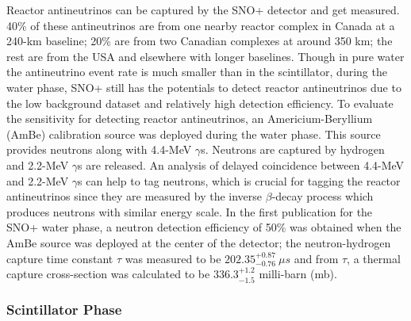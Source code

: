 Reactor antineutrinos can be captured by the SNO+ detector and get measured. 40\% of these antineutrinos are from one nearby reactor complex in Canada at a 240-km baseline; 20\% are from two Canadian complexes at around 350 km; the rest are from the USA and elsewhere with longer baselines\cite{whitepaper}. Though in pure water the antineutrino event rate is much smaller than in the scintillator, during the water phase, SNO+ still has the potentials to detect reactor antineutrinos due to the low background dataset and relatively high detection efficiency. To evaluate the sensitivity for detecting reactor antineutrinos, an Americium-Beryllium (AmBe) calibration source was deployed during the water phase. This source provides neutrons along with 4.4-MeV $\gamma$s. Neutrons are captured by hydrogen and 2.2-MeV $\gamma$s are released. An analysis of delayed coincidence between 4.4-MeV and 2.2-MeV $\gamma$s can help to tag neutrons, which is crucial for tagging the reactor antineutrinos since they are measured by the inverse $\beta$-decay process which produces neutrons with similar energy scale. In the first publication for the SNO+ water phase, a neutron detection efficiency of 50\% was obtained when the AmBe source was deployed at the center of the detector; the neutron-hydrogen capture time constant $\tau$ was measured to be $202.35_{-0.76}^{+0.87}~\mu s$ and from $\tau$, a thermal capture cross-section was calculated to be $336.3^{+1.2}_{-1.5}$ milli-barn (mb)\cite{anderson2020measurement}.

%
%

\subsubsection{Scintillator Phase}

